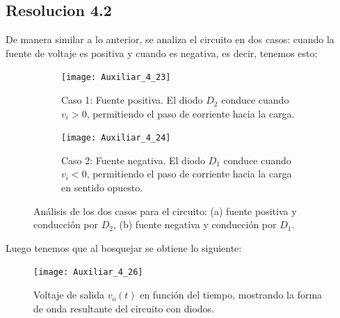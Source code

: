 \documentclass[
  11pt,
  letterpaper,
   addpoints,
  ]{exam}
\begin{document}
\begin{questions}
\begin{solution}
    \subsection*{Resolucion 4.2}
  De manera similar a lo anterior, se analiza el circuito en dos casos: cuando la fuente de voltaje es positiva y cuando es negativa, es decir, tenemos esto:

    \begin{figure}[H]
      \centering
      \begin{subfigure}[b]{0.48\textwidth}
        \centering
        \texttt{[image: Auxiliar\_4\_23]}
        \caption{Caso 1: Fuente positiva. El diodo $D_2$ conduce cuando $v_i > 0$, permitiendo el paso de corriente hacia la carga.}
        \label{fig:resolucion4.2a}
      \end{subfigure}\hfill
      \begin{subfigure}[b]{0.48\textwidth}
        \centering
        \texttt{[image: Auxiliar\_4\_24]}
        \caption{Caso 2: Fuente negativa. El diodo $D_1$ conduce cuando $v_i < 0$, permitiendo el paso de corriente hacia la carga en sentido opuesto.}
        \label{fig:resolucion4.2b}
      \end{subfigure}
      \caption{Análisis de los dos casos para el circuito: (a) fuente positiva y conducción por $D_2$, (b) fuente negativa y conducción por $D_1$.}
      \label{fig:resolucion4.2}
    \end{figure}
Luego tenemos que al bosquejar se obtiene lo siguiente:
\begin{figure}[H]
  \centering
  \texttt{[image: Auxiliar\_4\_26]}
  \caption{Voltaje de salida \(v_o(t)\) en función del tiempo, mostrando la forma de onda resultante del circuito con diodos.}
  \label{fig:voltaje-salida-4.2}
\end{figure}
\end{solution}
\end{questions}
\end{document}
